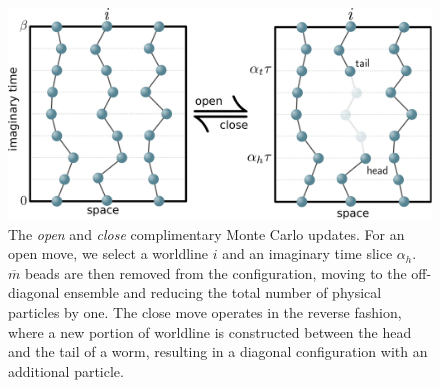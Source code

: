 \documentclass[prb,10pt,aps,floatfix,notitlepage]{revtex4-1}
\begin{document}
\begin{figure}
\begin{center}
\includegraphics[width=0.70\columnwidth]{Figures/openclose.pdf}
\end{center}
\caption{The \emph{open} and \emph{close} complimentary Monte Carlo updates.
For an open move, we select a worldline $i$ and an imaginary time slice
$\alpha_h$.  $\overline{m}$ beads are then removed from the configuration,
moving to the off-diagonal ensemble and reducing the total number of physical
particles by one.  The close move operates in the reverse fashion, where a new
portion of worldline is constructed between the head and the tail of a worm,
resulting in a diagonal configuration with an additional particle.}
\label{fig:openclose}
 \end{figure}
%
\end{document}
